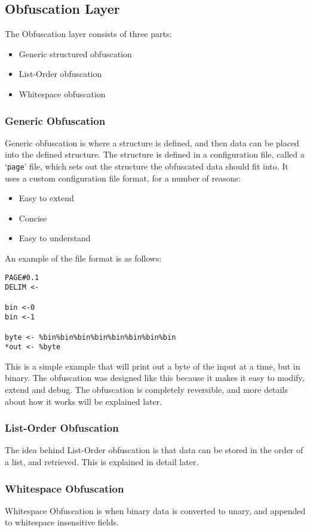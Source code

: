 \subsection{Obfuscation Layer}
The Obfuscation layer consists of three parts:
\begin{itemize}
    \item Generic structured obfuscation
    \item List-Order obfuscation
    \item Whitespace obfuscation
\end{itemize}

\subsubsection{Generic Obfuscation}
Generic obfuscation is where a structure is defined, and then data can be placed into the defined structure.
The structure is defined in a configuration file, called a `\texttt{page}' file, which sets out the structure the obfuscated data should fit into. It uses a custom configuration file format, for a number of reasons:
\begin{itemize}
    \item Easy to extend
    \item Concise
    \item Easy to understand
\end{itemize}
An example of the file format is as follows:
\begin{verbatim}
PAGE#0.1
DELIM <-

bin <-0
bin <-1 

byte <- %bin%bin%bin%bin%bin%bin%bin%bin
*out <- %byte
\end{verbatim}
This is a simple example that will print out a byte of the input at a time, but in binary.
The obfuscation was designed like this because it makes it easy to modify, extend and debug.
The obfuscation is completely reversible, and more details about how it works will be explained later.
\subsubsection{List-Order Obfuscation}
The idea behind List-Order obfuscation is that data can be stored in the order of a list, and retrieved. This is explained in detail later.

\subsubsection{Whitespace Obfuscation}
Whitespace Obfuscation is when binary data is converted to unary, and appended to whitespace insensitive fields.

